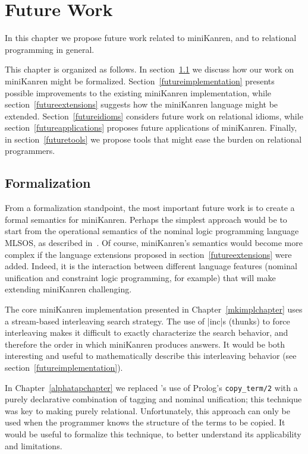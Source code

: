 \chapter{Future Work}\label{futureworkchapter}

In this chapter we propose future work related to miniKanren, and to
relational programming in general.

This chapter is organized as follows.  In
section~\ref{futureformalization} we discuss how our work on
miniKanren might be formalized.  Section~\ref{futureimplementation}
presents possible improvements to the existing miniKanren
implementation, while section~\ref{futureextensions} suggests how the
miniKanren language might be extended.  Section~\ref{futureidioms}
considers future work on relational idioms, while
section~\ref{futureapplications} proposes future applications of
miniKanren. Finally, in section~\ref{futuretools} we propose tools
that might ease the burden on relational programmers.

\section{Formalization}\label{futureformalization}

From a formalization standpoint, the most important future work is to
create a formal semantics for miniKanren.  Perhaps the simplest
approach would be to start from the operational semantics of the
nominal logic programming language MLSOS, as described
in~\citet{lakin2007}.  Of course, miniKanren's semantics would become
more complex if the language extensions proposed in
section~\ref{futureextensions} were added.  Indeed, it is the
interaction between different language features (nominal unification
and constraint logic programming, for example) that will make
extending miniKanren challenging.

The core miniKanren implementation presented in
Chapter~\ref{mkimplchapter} uses a stream-based interleaving search
strategy.  The use of \scheme|inc|s (thunks) to force interleaving
makes it difficult to exactly characterize the search behavior, and
therefore the order in which miniKanren produces answers.  It would be
both interesting and useful to mathematically describe this
interleaving behavior (see section~\ref{futureimplementation}).


In Chapter~\ref{alphatapchapter} we replaced \leantap's use of
Prolog's \mbox{{\tt copy\_term/2}} with a purely declarative combination of
tagging and nominal unification; this technique was key to making
\alphatapsp purely relational.  Unfortunately, this approach can only
be used when the programmer knows the structure of the terms to be
copied.  It would be useful to formalize this technique, to better
understand its applicability and limitations.

